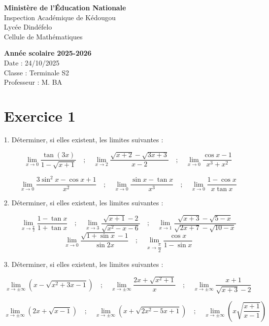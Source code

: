 \documentclass[12pt]{article}
\begin{document}
\noindent
\begin{minipage}[t]{0.48\textwidth}
\raggedright
\textbf{Ministère de l'Éducation Nationale}\\
Inspection Académique de Kédougou\\
Lycée Dindéfelo\\
Cellule de Mathématiques
\end{minipage}
\hfill
\begin{minipage}[t]{0.48\textwidth}
\raggedleft
\textbf{Année scolaire 2025-2026}\\
Date : 24/10/2025\\
Classe : Terminale S2\\
Professeur : M. BA
\end{minipage}

\vspace{1cm}
\section*{Exercice 1}

1. Déterminer, si elles existent, les limites suivantes :

\[
\lim_{x \to 0} \dfrac{\tan(3x)}{1 - \sqrt{x + 1}} \quad ; \quad \lim_{x \to 2} \dfrac{\sqrt{x+2} - \sqrt{3x+3}}{x-2} \quad ; \quad \lim_{x \to 0} \dfrac{\cos x - 1}{x^3 + x^2}
\]

\[
\lim_{x \to 0} \dfrac{3 \sin^2 x - \cos x + 1}{x^2} \quad ; \quad \lim_{x \to 0} \dfrac{\sin x - \tan x}{x^3}\quad ; \quad\lim_{x \to 0} \dfrac{1 - \cos x}{x \tan x}
\]

2. Déterminer, si elles existent, les limites suivantes :

\[
\lim_{x \to \frac{\pi}{2}} \dfrac{1 - \tan x}{1 + \tan x}\quad ; \quad \lim_{x \to 3} \dfrac{\sqrt{x+1} - 2}{\sqrt{x^2 - x - 6}}\quad ; \quad\lim_{x \to 1} \dfrac{\sqrt{x+3} - \sqrt{5-x}}{\sqrt{2x+7} - \sqrt{10-x}}
\]
\[
\lim_{x \to 0} \dfrac{\sqrt{1+\sin x} -1}{\sin 2x}\quad ; \quad\lim_{x \to \dfrac{\pi}{2}} \dfrac{\cos x}{1-\sin x}
\]

3. Déterminer, si elles existent, les limites suivantes :

\[
\lim_{x \to \pm \infty} \left(x - \sqrt{x^2 + 3x - 1}\right)\quad; \quad \lim_{x \to \pm \infty} \dfrac{2x + \sqrt{x^2 + 1}}{x}\quad; \quad
\lim_{x \to \pm \infty} \dfrac{x+1}{\sqrt{x+3}-2}
\]

\[
\lim_{x \to \pm \infty} \left(2x + \sqrt{x - 1}\right)\quad; \quad
\lim_{x \to \pm \infty} \left(x + \sqrt{2x^{2} - 5x + 1 }\right)\quad; \quad
\lim_{x \to \pm \infty} \left(x\sqrt{\dfrac{x+1}{x-1}}\right)
\]
\end{document}
